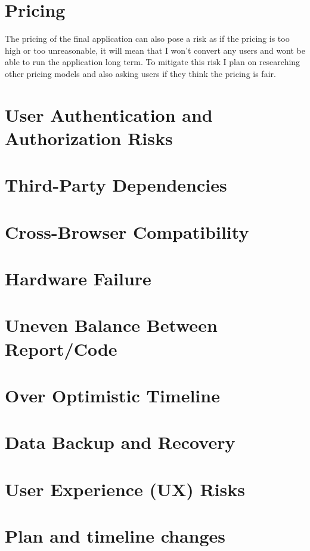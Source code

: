 \documentclass[]{project_report}
\begin{document}
\section{Pricing}
The pricing of the final application can also pose a risk as if the pricing is too high or too unreasonable, it will mean that I won't convert any users and wont be able to run the application long term. To mitigate this risk I plan on researching other pricing models and also asking users if they think the pricing is fair. 


\section{User Authentication and Authorization Risks}

\section{Third-Party Dependencies}

\section{Cross-Browser Compatibility}

\section{Hardware Failure}

\section{Uneven Balance Between Report/Code}

\section{Over Optimistic Timeline}

\section{Data Backup and Recovery}

\section{User Experience (UX) Risks}

\section{Plan and timeline changes}

\newpage
\begin{thebibliography}{99}

\end{thebibliography}
\label{endpage}
\end{document}
